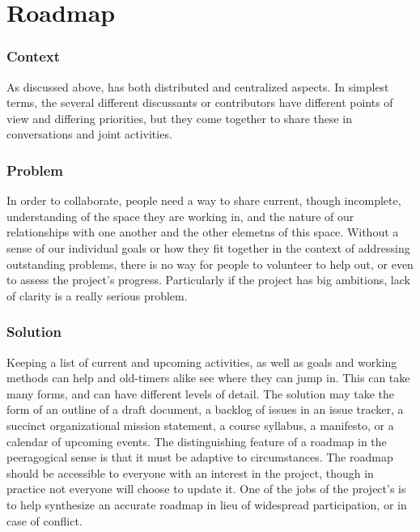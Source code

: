 \begingroup \color{OliveGreen}

\section{Roadmap} \label{sec:Roadmap}



\subsubsection*{Context} As discussed above,  has both distributed and centralized aspects. In simplest terms, the several different discussants or contributors have different points of view and differing priorities, but they come together to share these in conversations and joint activities.

\subsubsection*{Problem} In order to collaborate, people need a way to share current, though incomplete, understanding of the space they are working in, and the nature of our relationships with one another and the other elemetns of this space.  Without a sense of our individual goals or how they fit together in the context of addressing outstanding problems, there is no way for people to volunteer to help out, or even to assess the project's progress.  Particularly if the project has big ambitions, lack of clarity is a really serious problem.

\subsubsection*{Solution} Keeping a list of current and upcoming activities, as well as goals and working methods can help  and old-timers alike see where they can jump in.  This can take many forms, and can have different levels of detail.  The solution may take the form of an outline of a draft document, a backlog of issues in an issue tracker, a succinct organizational mission statement, a course syllabus, a manifesto, or a calendar of upcoming events.  The distinguishing feature of a roadmap in the peeragogical sense is that it must be adaptive to circumstances.  The roadmap should be accessible to everyone with an interest in the project, though in practice not everyone will choose to update it.  One of the jobs of the project's  is to help synthesize an accurate roadmap in lieu of widespread participation, or in case of conflict.

